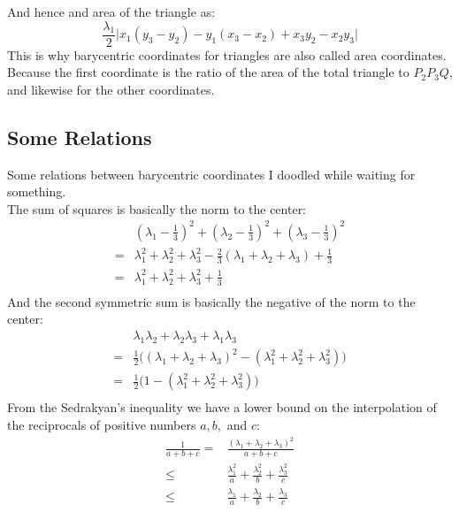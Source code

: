 And hence and area of the triangle as:
\[\frac{\lambda_1}{2}\big|x_1(y_3-y_2)-y_1(x_3-x_2)+x_3y_2-x_2y_3\big|\]
This is why barycentric coordinates for triangles are also called area coordinates.
Because the first coordinate is the ratio of the area of the total triangle to $P_2P_3Q$,
and likewise for the other coordinates.
\\

\subsection{Some Relations}
Some relations between barycentric coordinates I doodled while waiting for something.
\\
The sum of squares is basically the norm to the center:
\begin{equation*}
\begin{aligned}
	&\left(\lambda_1-\frac{1}{3}\right)^2+\left(\lambda_2-\frac{1}{3}\right)^2+\left(\lambda_3-\frac{1}{3}\right)^2\\
	=&\lambda_1^2+\lambda_2^2+\lambda_3^2-\frac{2}{3}(\lambda_1+\lambda_2+\lambda_3)+\frac{1}{3}\\
	=&\lambda_1^2+\lambda_2^2+\lambda_3^2+\frac{1}{3}\\
\end{aligned}
\end{equation*}
And the second symmetric sum is basically the negative of the norm to the center:
\begin{equation*}
\begin{aligned}
	&\lambda_1\lambda_2+\lambda_2\lambda_3+\lambda_1\lambda_3\\
	=& \frac{1}{2}\bigg((\lambda_1+\lambda_2+\lambda_3)^2 -(\lambda_1^2+\lambda_2^2+\lambda_3^2)\bigg)\\
	=& \frac{1}{2}\bigg(1 -(\lambda_1^2+\lambda_2^2+\lambda_3^2)\bigg)\\
\end{aligned}
\end{equation*}
From the Sedrakyan's inequality we have a lower bound on the interpolation of the reciprocals of positive numbers $a,b,$ and $c$:
\begin{equation*}
\begin{aligned}
	\frac{1}{a+b+c} =& \frac{(\lambda_1+\lambda_2+\lambda_3)^2}{a+b+c} \\
	\leq& \frac{\lambda_1^2}{a}+\frac{\lambda_2^2}{b}+\frac{\lambda_3^2}{c}\\
	\leq& \frac{\lambda_1}{a}+\frac{\lambda_2}{b}+\frac{\lambda_3}{c}\\
\end{aligned}
\end{equation*}
